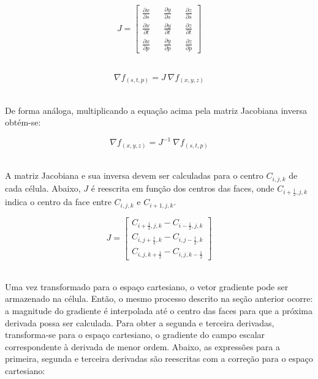 \begin{equation}\label{eq:jacob}
	J = 
	\begin{bmatrix}
	\frac{\partial x}{\partial s} && \frac{\partial y}{\partial s} && \frac{\partial z}{\partial s} \\
	\frac{\partial x}{\partial t} && \frac{\partial y}{\partial t} && \frac{\partial z}{\partial t} \\
	\frac{\partial x}{\partial p} && \frac{\partial y}{\partial p} && \frac{\partial z}{\partial p}
	\end{bmatrix}
\end{equation} \

\begin{equation}\label{eq:cadeia_jacob}
	\nabla f_{(s, t, p)} = J\ \nabla f_{(x, y, z)}
\end{equation} \

	De forma análoga, multiplicando a equação acima pela matriz Jacobiana inversa obtém-se:
	
\begin{equation}\label{eq:cadeia_jacob_inv}
	\nabla f_{(x, y, z)} = J^{-1}\ \nabla f_{(s, t, p)}
\end{equation} \

	A matriz Jacobiana e sua inversa devem ser calculadas para o centro $ C_{i, j, k} $ de cada célula. Abaixo, $ J $ é reescrita em função dos centros das faces, onde $ C_{i + \frac{1}{2}, j, k} $ indica o centro da face entre $ C_{i, j, k} $ e $ C_{i + 1, j, k} $.

\begin{equation}\label{eq:jacob_cell}
	J = 
\begin{bmatrix}
	C_{i + \frac{1}{2}, j, k} - C_{i - \frac{1}{2}, j, k}\\
	C_{i, j + \frac{1}{2}, k} - C_{i, j - \frac{1}{2}, k}\\
	C_{i, j, k + \frac{1}{2}} - C_{i, j, k - \frac{1}{2}}
\end{bmatrix}	
\end{equation} \

	Uma vez transformado para o espaço cartesiano, o vetor gradiente pode ser armazenado na célula. Então, o mesmo processo descrito na seção anterior ocorre: a magnitude do gradiente é interpolada até o centro das faces para que a próxima derivada possa ser calculada. Para obter a segunda e terceira derivadas, transforma-se para o espaço cartesiano, o gradiente do campo escalar correspondente à derivada de menor ordem. Abaixo, as expressões para a primeira, segunda e terceira derivadas são reescritas com a correção para o espaço cartesiano:
	
